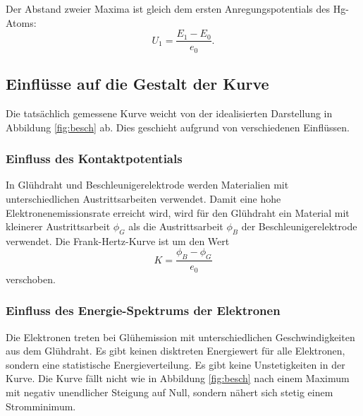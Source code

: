 \noindent Der Abstand zweier Maxima ist gleich dem ersten Anregungspotentials des Hg-Atoms:
\begin{equation}
  \label{eq:pot}
  U_1 = \frac{E_1 - E_0}{e_0}  .
\end{equation}
 \subsection{Einflüsse auf die Gestalt der Kurve}
Die tatsächlich gemessene Kurve weicht von der idealisierten Darstellung in Abbildung \ref{fig:besch} ab.
Dies geschieht aufgrund von verschiedenen Einflüssen.
\subsubsection{Einfluss des Kontaktpotentials}
In Glühdraht und Beschleunigerelektrode werden Materialien mit unterschiedlichen Austrittsarbeiten verwendet.
Damit eine hohe Elektronenemissionsrate erreicht wird, wird für den Glühdraht ein Material mit kleinerer Austrittsarbeit $\phi_G$ als die Austrittsarbeit $\phi_B$ der Beschleunigerelektrode verwendet.
Die Frank-Hertz-Kurve ist um den Wert
\begin{equation}
  \label{eq:k}
  K = \frac{\phi_B - \phi_G}{e_0}
\end{equation}
verschoben.
\subsubsection{Einfluss des Energie-Spektrums der Elektronen}
Die Elektronen treten bei Glühemission mit unterschiedlichen Geschwindigkeiten aus dem Glühdraht.
Es gibt keinen disktreten Energiewert für alle Elektronen, sondern eine statistische Energieverteilung.
Es gibt keine Unstetigkeiten in der Kurve.
Die Kurve fällt nicht wie in Abbildung \ref{fig:besch} nach einem Maximum mit negativ unendlicher Steigung auf Null, sondern nähert sich stetig einem Stromminimum.
